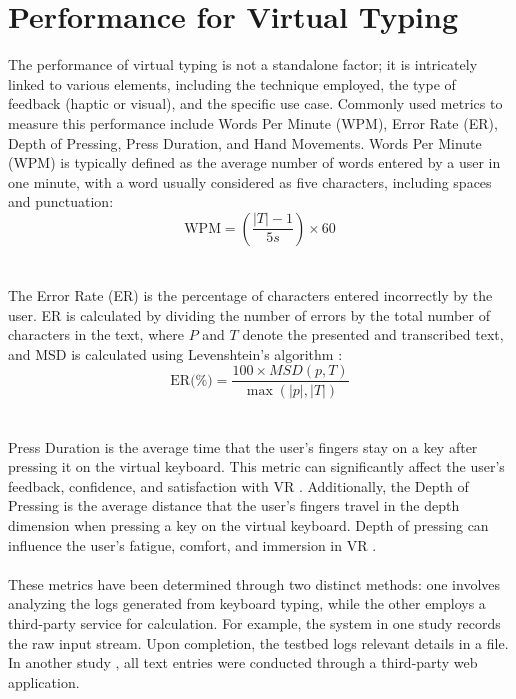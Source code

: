 \section{Performance for Virtual Typing }
\label{sec: Performance for Virtual Typing}

The performance of virtual typing is not a standalone factor; it is intricately linked to various elements, including the technique employed, the type of feedback (haptic or visual), and the specific use case. Commonly used metrics to measure this performance include Words Per Minute (WPM), Error Rate (ER), Depth of Pressing, Press Duration, and Hand Movements.
Words Per Minute (WPM) is typically defined as the average number of words entered by a user in one minute, with a word usually considered as five characters, including spaces and punctuation:
\begin{equation}
    \text{WPM} = \left( \frac{|T| - 1}{5s} \right) \times 60
  \end{equation} \\ \\
The Error Rate (ER) is the percentage of characters entered incorrectly by the user. ER is calculated by dividing the number of errors by the total number of characters in the text, where \( P \) and \( T \) denote the presented and transcribed text, and MSD is calculated using Levenshtein’s algorithm \cite{levenshteinWiki}:
\begin{equation}
   \text{ER(\%)} = \frac{100 \times MSD(p, T)}{\max(|p|, |T|) }
  \end{equation} \\ \\
Press Duration is the average time that the user's fingers stay on a key after pressing it on the virtual keyboard. This metric can significantly affect the user's feedback, confidence, and satisfaction with \ac{VR} \cite{dube2019textentry}. Additionally, the Depth of Pressing is the average distance that the user's fingers travel in the depth dimension when pressing a key on the virtual keyboard. Depth of pressing can influence the user's fatigue, comfort, and immersion in \ac{VR} \cite{dube2019textentry}.\\ \\
These metrics have been determined through two distinct methods: one involves analyzing the logs generated from keyboard typing, while the other employs a third-party service for calculation. For example, the system in one study \cite{teather2020flik} records the raw input stream. Upon completion, the testbed logs relevant details in a file. In another study \cite{pseudoHaptics2022}, all text entries were conducted through a third-party web application.

